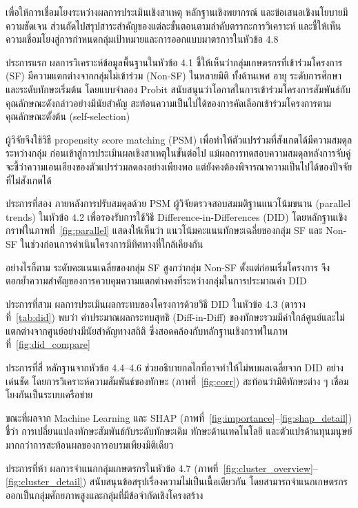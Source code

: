 เพื่อให้การเชื่อมโยงระหว่างผลการประเมินเชิงสาเหตุ หลักฐานเชิงพยากรณ์ และข้อเสนอเชิงนโยบายมีความชัดเจน ส่วนถัดไปสรุปสาระสำคัญของแต่ละขั้นตอนตามลำดับตรรกะการวิเคราะห์ และชี้ให้เห็นความเชื่อมโยงสู่การกำหนดกลุ่มเป้าหมายและการออกแบบมาตรการในหัวข้อ 4.8

ประการแรก ผลการวิเคราะห์ข้อมูลพื้นฐานในหัวข้อ 4.1 ชี้ให้เห็นว่ากลุ่มเกษตรกรที่เข้าร่วมโครงการ (SF) มีความแตกต่างจากกลุ่มไม่เข้าร่วม (Non-SF) ในหลายมิติ ทั้งด้านเพศ อายุ ระดับการศึกษา และระดับทักษะเริ่มต้น โดยแบบจำลอง Probit สนับสนุนว่าโอกาสในการเข้าร่วมโครงการสัมพันธ์กับคุณลักษณะดังกล่าวอย่างมีนัยสำคัญ สะท้อนความเป็นไปได้ของการคัดเลือกเข้าร่วมโครงการตามคุณลักษณะตั้งต้น (self-selection)

ผู้วิจัยจึงใช้วิธี propensity score matching (PSM) เพื่อทำให้ตัวแปรร่วมที่สังเกตได้มีความสมดุลระหว่างกลุ่ม ก่อนเข้าสู่การประเมินผลเชิงสาเหตุในขั้นต่อไป แม้ผลการทดสอบความสมดุลหลังการจับคู่จะชี้ว่าความเอนเอียงของตัวแปรร่วมลดลงอย่างเพียงพอ แต่ยังคงต้องพิจารณาความเป็นไปได้ของปัจจัยที่ไม่สังเกตได้

ประการที่สอง ภายหลังการปรับสมดุลด้วย PSM ผู้วิจัยตรวจสอบสมมติฐานแนวโน้มขนาน (parallel trends) ในหัวข้อ 4.2 เพื่อรองรับการใช้วิธี Difference-in-Differences (DID) โดยหลักฐานเชิงกราฟในภาพที่~\ref{fig:parallel} แสดงให้เห็นว่า แนวโน้มคะแนนทักษะเฉลี่ยของกลุ่ม SF และ Non-SF ในช่วงก่อนการดำเนินโครงการมีทิศทางที่ใกล้เคียงกัน

อย่างไรก็ตาม ระดับคะแนนเฉลี่ยของกลุ่ม SF สูงกว่ากลุ่ม Non-SF ตั้งแต่ก่อนเริ่มโครงการ จึงตอกย้ำความสำคัญของการควบคุมความแตกต่างคงที่ระหว่างกลุ่มในการประมาณค่า DID

ประการที่สาม ผลการประเมินผลกระทบของโครงการด้วยวิธี DID ในหัวข้อ 4.3 (ตารางที่~\ref{tab:did}) พบว่า ค่าประมาณผลกระทบสุทธิ (Diff-in-Diff) ของทักษะรวมมีค่าใกล้ศูนย์และไม่แตกต่างจากศูนย์อย่างมีนัยสำคัญทางสถิติ ซึ่งสอดคล้องกับหลักฐานเชิงกราฟในภาพที่~\ref{fig:did_compare}

ประการที่สี่ หลักฐานจากหัวข้อ 4.4--4.6 ช่วยอธิบายกลไกที่อาจทำให้ไม่พบผลเฉลี่ยจาก DID อย่างเด่นชัด โดยการวิเคราะห์ความสัมพันธ์ของทักษะ (ภาพที่~\ref{fig:corr}) สะท้อนว่ามิติทักษะต่าง ๆ เชื่อมโยงกันเป็นระบบเครือข่าย

ขณะที่ผลจาก Machine Learning และ SHAP (ภาพที่~\ref{fig:importance}--\ref{fig:shap_detail}) ชี้ว่า การเปลี่ยนแปลงทักษะสัมพันธ์กับระดับทักษะเดิม ทักษะด้านเทคโนโลยี และตัวแปรด้านทุนมนุษย์ มากกว่าการสะท้อนผลของการอบรมเพียงมิติเดียว

ประการที่ห้า ผลการจำแนกกลุ่มเกษตรกรในหัวข้อ 4.7 (ภาพที่~\ref{fig:cluster_overview}--\ref{fig:cluster_detail}) สนับสนุนข้อสรุปเรื่องความไม่เป็นเนื้อเดียวกัน โดยสามารถจำแนกเกษตรกรออกเป็นกลุ่มศักยภาพสูงและกลุ่มที่มีข้อจำกัดเชิงโครงสร้าง

